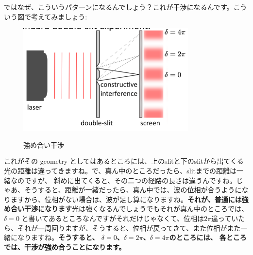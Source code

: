 ではなぜ、こういうパターンになるんでしょう？これが干渉になるんです。こういう図で考えてみましょう:
\begin{figure}[H]
   \centering
    \includegraphics[width=0.8\textwidth]{lesson6/double_slit_constructive.pdf}
    \label{fig: 1}
    \begin{center}
        \caption{強め合い干渉}
    \end{center}
\end{figure}

これがその geometry としてはあるところには、上のslitと下のslitから出てくる光の距離は違ってきますね。で、真ん中のところだったら、slitまでの距離は一緒なのですが、
斜めに出てくると、その二つの経路の長さは違うんですね。じゃあ、そうすると、距離が一緒だったら、真ん中では、波の位相が合うようになりますから、位相がない場合は、波が足し算になりますね。\textbf{それが、普通には強め合い干渉になります}光は強くなるんでしょうでもそれが真ん中のところでは、$\delta = 0$ と書いてあるところなんですがそれだけじゃなくて、位相は$2\pi$違っていたら、それが一周回りますが、そうすると、位相が戻ってきて、また位相がまた一緒になりますね。\textbf{そうすると、
$\delta = 0$、$\delta = 2\pi$、$\delta = 4\pi$のところには、
各ところでは、干渉が強め合うことになります。}

